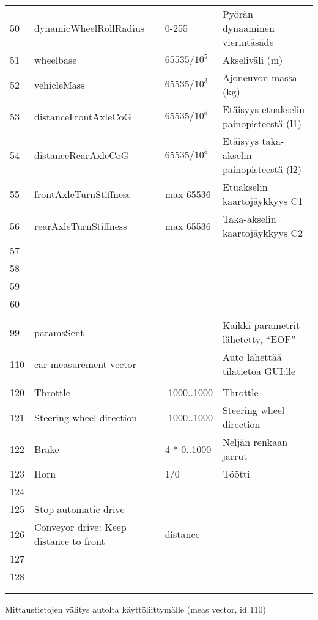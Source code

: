 \begin{longtable}{l | p{5cm} | l | p{5cm} }
50 & dynamicWheelRollRadius & 0-255 & Pyörän dynaaminen vierintäsäde\\
51 & wheelbase & $65535/10^5$ & Akseliväli (m)\\
52 & vehicleMass & $65535/10^3$ & Ajoneuvon massa (kg)\\
53 & distanceFrontAxleCoG & $65535/10^5$ & Etäisyys etuakselin painopisteestä (l1)\\
54 & distanceRearAxleCoG & $65535/10^5$ & Etäisyys taka-akselin painopisteestä (l2)\\
55 & frontAxleTurnStiffness & max 65536 & Etuakselin kaartojäykkyys C1\\
56 & rearAxleTurnStiffness & max 65536 & Taka-akselin kaartojäykkyys C2\\
57 &  &  & \\
58 &  &  & \\
59 &  &  & \\
60 &  &  & \\
 &  &  & \\
99 & paramsSent & - & Kaikki parametrit lähetetty, ``EOF''\\
110 & car measurement vector & - & Auto lähettää tilatietoa GUI:lle\\
 &  &  & \\
120 & Throttle & -1000..1000 & Throttle\\
121 & Steering wheel direction & -1000..1000 & Steering wheel direction\\
122 & Brake & 4 * 0..1000 & Neljän renkaan jarrut\\
123 & Horn & 1/0 & Töötti \\
124 &  &  & \\
125 & Stop automatic drive & - & \\
126 & Conveyor drive: Keep distance to front & distance & \\
127 &  &  & \\
128 &  &  & \\
 &  &  & \\
 &  &  & \\
\end{longtable}

Mittaustietojen välitys autolta käyttöliittymälle (meas vector, id 110)

